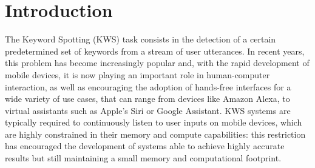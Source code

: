 
\section{Introduction}
\label{sec:introduction}
	
The Keyword Spotting (KWS) task consists in the detection of a certain predetermined set of keywords from a stream of user utterances. In recent years, this problem has become increasingly popular and, with the rapid development of mobile devices, it is now playing an important role in human-computer interaction, as well as encouraging the adoption of hands-free interfaces for a wide variety of use cases, that can range from  devices like Amazon Alexa, to virtual assistants such as Apple's Siri or Google Assistant. KWS systems are typically required to continuously listen to user inputs on mobile devices, which are highly constrained in their memory and compute capabilities: this restriction has encouraged the development of systems able to achieve highly accurate results but still maintaining a small memory and computational footprint.

